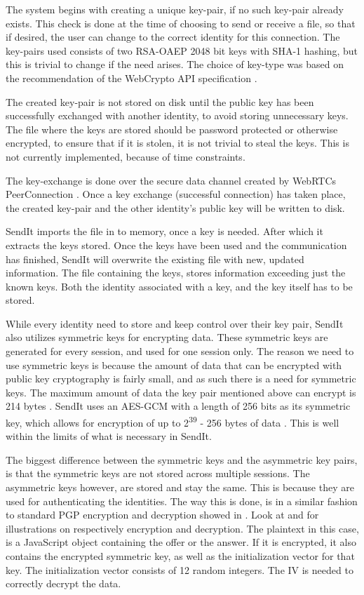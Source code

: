 	The system begins with creating a unique key-pair, if no such key-pair already exists. This check is done at the time of choosing to send or receive a file, so that if desired, the user can change to the correct identity for this connection. The key-pairs used consists of two RSA-OAEP 2048 bit keys with SHA-1 hashing, but this is trivial to change if the need arises. The choice of key-type was based on the recommendation of the WebCrypto API specification \cite{ar_webcrypto}.

	The created key-pair is not stored on disk until the public key has been successfully exchanged with another identity, to avoid storing unnecessary keys. The file where the keys are stored should be password protected or otherwise encrypted, to ensure that if it is stolen, it is not trivial to steal the keys. This is not currently implemented, because of time constraints. 

	The key-exchange is done over the secure data channel created by WebRTCs PeerConnection \cite{ar_webrtc}. Once a key exchange (successful connection) has taken place, the created key-pair and the other identity's public key will be written to disk.

	SendIt imports the file in to memory, once a key is needed. After which it extracts the keys stored. Once the keys have been used and the communication has finished, SendIt will overwrite the existing file with new, updated information. The file containing the keys, stores information exceeding just the known keys. Both the identity associated with a key, and the key itself has to be stored.

	While every identity need to store and keep control over their key pair, SendIt also utilizes symmetric keys for encrypting data. These symmetric keys are generated for every session, and used for one session only. The reason we need to use symmetric keys is because the amount of data that can be encrypted with public key cryptography is fairly small, and as such there is a need for symmetric keys. The maximum amount of data the key pair mentioned above can encrypt is 214 bytes \cite{PKCSV2RSA2012}. SendIt uses an AES-GCM with a length of 256 bits as its symmetric key, which allows for encryption of up to 2\textsuperscript{39} - 256 bytes of data \cite{ar_webcrypto}. This is well within the limits of what is necessary in SendIt. 

	The biggest difference between the symmetric keys and the asymmetric key pairs, is that the symmetric keys are not stored across multiple sessions. The asymmetric keys however, are stored and stay the same. This is because they are used for authenticating the identities. The way this is done, is in a similar fashion to standard PGP encryption and decryption showed in . Look at  and  for illustrations on respectively encryption and decryption. The plaintext in this case, is a JavaScript object containing the offer or the answer. If it is encrypted, it also contains the encrypted symmetric key, as well as the initialization vector for that key. The initialization vector consists of 12 random integers. The IV is needed to correctly decrypt the data. 

